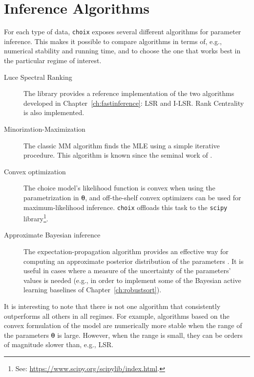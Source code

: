 \section{Inference Algorithms}

For each type of data, \texttt{choix} exposes several different algorithms for parameter inference.
This makes it possible to compare algorithms in terms of, e.g., numerical stability and running time, and to choose the one that works best in the particular regime of interest.

\begin{description}
\item[Luce Spectral Ranking] The library provides a reference implementation of the two algorithms developed in Chapter~\ref{ch:fastinference}: LSR and I-LSR.
Rank Centrality \citep{negahban2012iterative} is also implemented.

\item[Minorization-Maximization] The classic MM algorithm finds the MLE using a simple iterative procedure.
This algorithm is known since the seminal work of \citet{zermelo1928berechnung}.

\item[Convex optimization] The choice model's likelihood function is convex when using the parametrization in $\bm{\theta}$, and off-the-shelf convex optimizers can be used for maximum-likelihood inference.
\texttt{choix} offloads this task to the \texttt{scipy} library\footnote{%
See: \url{https://www.scipy.org/scipylib/index.html}.
}.

\item[Approximate Bayesian inference] The expectation-propagation algorithm provides an effective way for computing an approximate posterior distribution of the parameters \citep{minka2001family, chu2005gaussian}.
It is useful in cases where a measure of the uncertainty of the parameters' values is needed (e.g., in order to implement some of the Bayesian active learning baselines of Chapter~\ref{ch:robustsort}).
\end{description}

It is interesting to note that there is not one algorithm that consistently outperforms all others in all regimes.
For example, algorithms based on the convex formulation of the model are numerically more stable when the range of the parameters $\bm{\theta}$ is large.
However, when the range is small, they can be orders of magnitude slower than, e.g., LSR.
